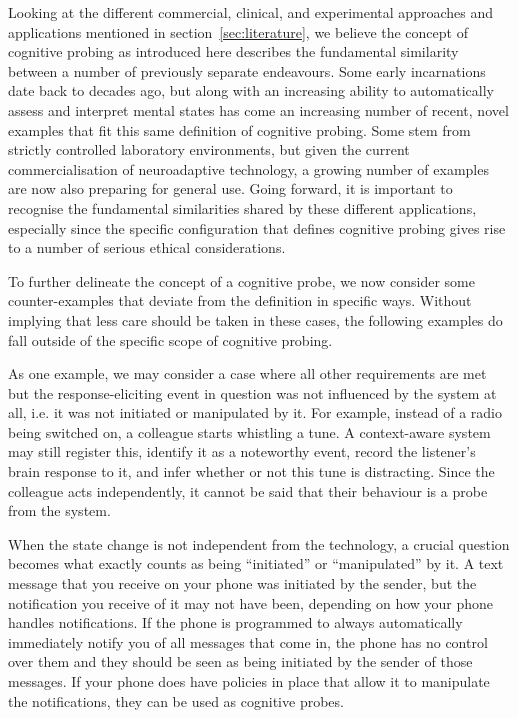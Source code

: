 Looking at the different commercial, clinical, and experimental approaches and applications mentioned in section~\ref{sec:literature}, we believe the concept of cognitive probing as introduced here describes the fundamental similarity between a number of previously separate endeavours. Some early incarnations date back to decades ago, but along with an increasing ability to automatically assess and interpret mental states has come an increasing number of recent, novel examples that fit this same definition of cognitive probing. Some stem from strictly controlled laboratory environments, but given the current commercialisation of neuroadaptive technology, a growing number of examples are now also preparing for general use. Going forward, it is important to recognise the fundamental similarities shared by these different applications, especially since the specific configuration that defines cognitive probing gives rise to a number of serious ethical considerations.

To further delineate the concept of a cognitive probe, we now consider some counter-examples that deviate from the definition in specific ways. Without implying that less care should be taken in these cases, the following examples do fall outside of the specific scope of cognitive probing.

As one example, we may consider a case where all other requirements are met but the response-eliciting event in question was not influenced by the system at all, i.e. it was not initiated or manipulated by it. For example, instead of a radio being switched on, a colleague starts whistling a tune. A context-aware system may still register this, identify it as a noteworthy event, record the listener's brain response to it, and infer whether or not this tune is distracting. Since the colleague acts independently, it cannot be said that their behaviour is a probe from the system.

When the state change is not independent from the technology, a crucial question becomes what exactly counts as being ``initiated'' or ``manipulated'' by it. A text message that you receive on your phone was initiated by the sender, but the notification you receive of it may not have been, depending on how your phone handles notifications. If the phone is programmed to always automatically immediately notify you of all messages that come in, the phone has no control over them and they should be seen as being initiated by the sender of those messages. If your phone does have policies in place that allow it to manipulate the notifications, they can be used as cognitive probes. 

